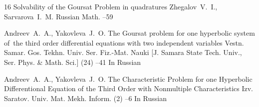 \begin{thebibliography}{16}
\paper Solvability of the Goursat Problem in quadratures
\by Zhegalov~V.~I., Sarvarova~I.~M.
\jour Russian Math.
--59


\by Andreev~A.~A., Yakovleva~J.~O.
\paper The Goursat problem for one hyperbolic system of~the third order differential equations with two independent variables
\jour Vestn. Samar. Gos. Tekhn. Univ. Ser. Fiz.-Mat. Nauki \rm [J. Samara State Tech. Univ., Ser. Phys. \& Math. Sci.]
(24)
--41
\lang In Russian

\by Andreev~A.~A., Yakovleva~J.~O.
\paper The Characteristic Problem for one Hyperbolic Differentional Equation of the Third Order with Nonmultiple Characteristics
\jour Izv. Saratov. Univ. Mat. Mekh. Inform.
(2)
--6
\lang In Russian

\end{thebibliography}


\EngDate	

\renewcommand{\baselinestretch}{0.9}

\newpage \Russian


% 
